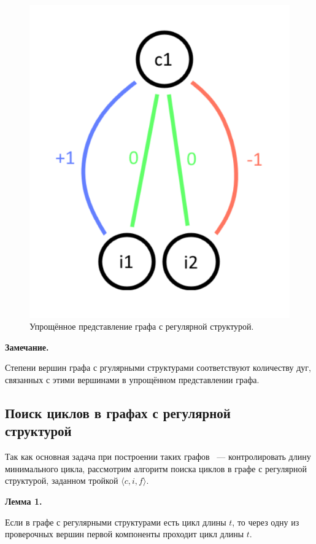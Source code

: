 \documentclass[14pt]{mmcs-article}
\begin{document}
\begin{figure}[H]
  \centering
  \includegraphics[scale=0.4]{Fig_2.png}
  \caption{ Упрощённое представление графа с регулярной структурой. }
  \label{image:2}
\end{figure}

\textbf{Замечание.}

Степени вершин графа с ргулярными структурами соответствуют количеству дуг, связанных с этими вершинами в упрощённом представлении графа.

\subsection{Поиск циклов в графах с регулярной\\ структурой}

Так как основная задача при построении таких графов ~--- контролировать длину минимального цикла, рассмотрим алгоритм поиска циклов в графе с регулярной структурой, заданном тройкой $\langle c, i, f \rangle$.

\textbf{Лемма 1.}

Если в графе с регулярными структурами есть цикл длины $t$, то через одну из проверочных вершин первой компоненты проходит цикл длины $t$.
\end{document}

